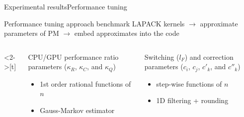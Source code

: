 \documentclass[xcolor=table,final]{beamer} %
\begin{document}
\begin{frame}{Experimental results}{Performance tuning}

  \begin{block}{Performance tuning approach}
    benchmark LAPACK kernels 
    $\to$
    approximate parameters of PM %
    $\to$
    embed approximates into the code
  \end{block}

  \begin{columns}<2->[t]%
    \begin{column}[t]{0.5\textwidth}
      \centering
      CPU/GPU performance ratio parameters 
      ($\kappa_R$, $\kappa_C$, and $\kappa_Q$)

      
      \begin{itemize}
        \small
      \item 1st order rational functions of $n$
      \item Gauss-Markov estimator
      \end{itemize}
    \end{column}

    \begin{column}[t]{0.5\textwidth}
      \centering
      Switching ($l_F$) and  correction parameters 
      ($c_i$, $c_j$, $c'_k$, and $c''_k$)

      \begin{itemize}
        \small
      \item %
        step-wise functions of $n$
      \item 1D filtering + rounding
      \end{itemize}
    \end{column}

  \end{columns}
\end{frame}


\end{document}
